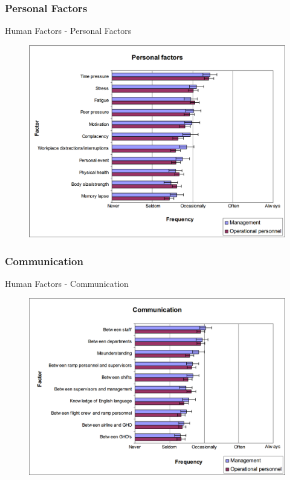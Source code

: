 \subsubsection{Personal Factors}
\begin{frame}{Human Factors - Personal Factors}{}
	\begin{figure}[H]
	\centering
	\includegraphics[width=\textwidth]{Grafik/PersonalFactors}
\end{figure}
\end{frame}

\subsubsection{Communication}
\begin{frame}{Human Factors - Communication}{}
	\begin{figure}[H]
	\centering
	\includegraphics[width=\textwidth]{Grafik/CommunicationalFactors}
\end{figure}
\end{frame}

